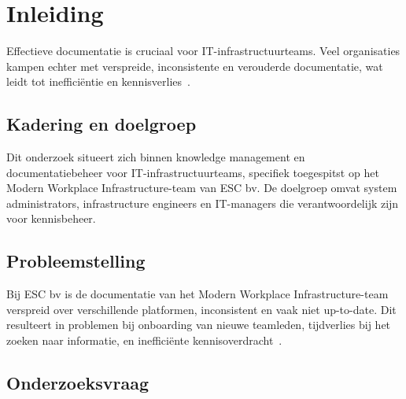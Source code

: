 


% 

\section{Inleiding}%
\label{sec:inleiding}

Effectieve documentatie is cruciaal voor IT-infrastructuurteams. Veel organisaties kampen echter met verspreide, inconsistente en verouderde documentatie, wat leidt tot inefficiëntie en kennisverlies~\autocite{Abbas2022}.

\subsection{Kadering en doelgroep}

Dit onderzoek situeert zich binnen knowledge management en documentatiebeheer voor IT-infrastructuurteams, specifiek toegespitst op het Modern Workplace Infrastructure-team van ESC bv. De doelgroep omvat system administrators, infrastructure engineers en IT-managers die verantwoordelijk zijn voor kennisbeheer.

\subsection{Probleemstelling}

Bij ESC bv is de documentatie van het Modern Workplace Infrastructure-team verspreid over verschillende platformen, inconsistent en vaak niet up-to-date. Dit resulteert in problemen bij onboarding van nieuwe teamleden, tijdverlies bij het zoeken naar informatie, en inefficiënte kennisoverdracht~\autocite{Walker2007}.

\subsection{Onderzoeksvraag}

